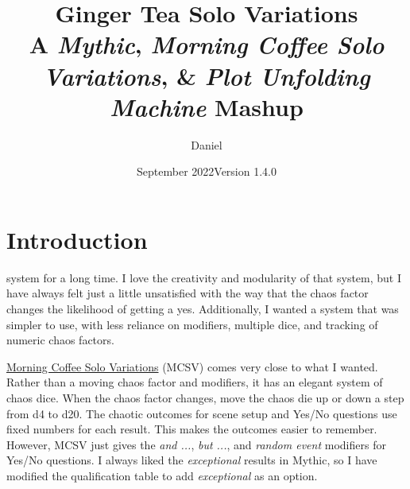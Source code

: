 

\title{
\Huge{Ginger Tea Solo Variations}
\\ \small{A \emph{Mythic}, \emph{Morning Coffee Solo Variations}, \& \emph{Plot Unfolding Machine} Mashup}
}
\date{September 2022\newline{}Version 1.4.0}
\author{Daniel}


\frontmatter
\maketitle


\mainmatter

\section{Introduction}
system for a long time. I love the creativity and modularity of that system,
but I have always felt just a little unsatisfied with the way that the chaos
factor changes the likelihood of getting a yes. Additionally, I wanted a system
that was simpler to use, with less reliance on modifiers, multiple dice, and
tracking of numeric chaos factors.

\href{https://aleaiactandaest.blogspot.com/p/downloads.html}{Morning Coffee Solo
Variations} (MCSV) comes very close to what I wanted. Rather than a moving chaos
factor and modifiers, it has an elegant system of chaos dice. When the chaos
factor changes, move the chaos die up or down a step from d4 to d20. The chaotic
outcomes for scene setup and Yes/No questions use fixed numbers for each result.
This makes the outcomes easier to remember. However, MCSV just gives the
\emph{and ...}, \emph{but ...}, and \emph{random event} modifiers for Yes/No
questions. I always liked the \emph{exceptional} results in Mythic, so I have
modified the qualification table to add \emph{exceptional} as an option.

